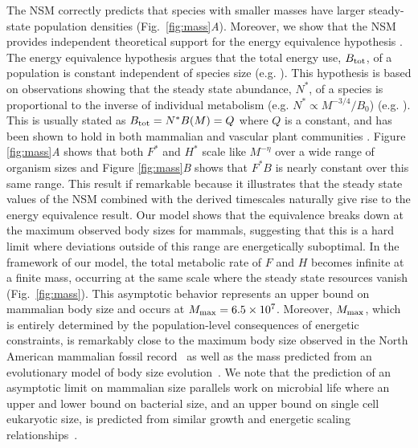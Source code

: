 \documentclass{pnastwo}
\begin{document}
\begin{article}
The NSM correctly predicts that species with smaller masses have larger steady-state population densities (Fig.~\ref{fig:mass}\emph{A}).
Moreover, we show that the NSM provides independent theoretical support for the energy equivalence hypothesis \cite{allen2002,enquist1998}.
The energy equivalence hypothesis argues that the total energy use, $B_{\rm tot}$, of a population is constant independent of species size (e.g. \cite{allen2002,enquist1998}). %
This hypothesis is based on observations showing that the steady state abundance, $N^*$, of a species is proportional to the inverse of individual metabolism (e.g. $N^*\propto M^{-3/4}/B_{0}$)  (e.g. \cite{allen2002,enquist1998}).
This is usually stated as $B_{\rm tot}=N^*B(M)=Q$ where $Q$ is a constant, and has been shown to hold in both mammalian and vascular plant communities \cite{allen2002,enquist1998}.
Figure \ref{fig:mass}\emph{A} shows that both $F^{*}$ and $H^{*}$ scale like $M^{-\eta}$ over a wide range of organism sizes and Figure \ref{fig:mass}\emph{B} shows that $F^{*}B$ is nearly constant over this same range.
This result if remarkable because it illustrates that the steady state values of the NSM combined with the derived timescales naturally give rise to the energy equivalence result.
Our model shows that the equivalence breaks down at the maximum observed body sizes for mammals, suggesting that this is a hard limit where deviations outside of this range are energetically suboptimal. %
In the framework of our model, the total metabolic rate of $F$ and $H$ becomes infinite at a finite mass, occurring at the same scale where the steady state resources vanish (Fig.~\ref{fig:mass}). This asymptotic behavior represents an upper bound on mammalian body size and occurs at $M_{\rm max}=6.5\times10^7$.
Moreover, $M_{\rm max}$, which is entirely determined by the population-level consequences of energetic constraints, is remarkably close to the maximum body size observed in the North American mammalian fossil record~\cite{Alroy:1998p1594} as well as the mass predicted from an evolutionary model of body size evolution~\cite{Clauset:2009fh}.
We note that the prediction of an asymptotic limit on mammalian size parallels work on microbial life where an upper and lower bound on bacterial size, and an upper bound on single cell eukaryotic size, is predicted from similar growth and energetic scaling relationships~\cite{Kempes:2012hy,Kempes:2016}. %



\end{article}
\end{document}
